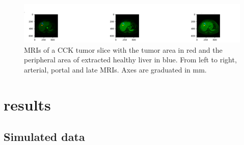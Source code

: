 \documentclass[preprint,12pt]{elsarticle}
\begin{document}
\begin{figure}[tbp]
    \centering
    \includegraphics[scale = 0.3]{./images/sain.png}
    \caption{MRIs of a CCK tumor slice with the tumor area in red and the peripheral area of extracted healthy liver in blue. From left to right, arterial, portal and late MRIs. Axes are graduated in mm.}
    \label{fig:healthy_zone}
\end{figure}

\newpage
\section{results}
\label{sec:results}
\subsection{Simulated data}
\end{document}
